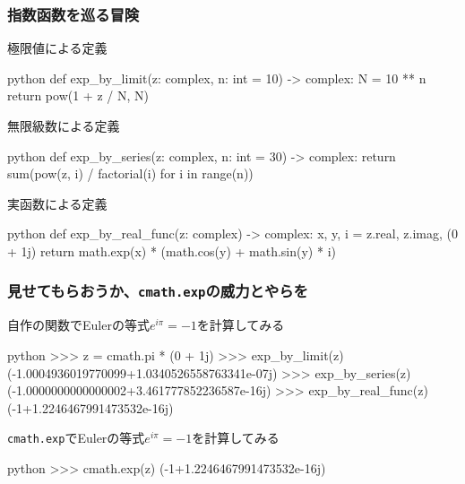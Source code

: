 \documentclass[dvipdfmx,11pt,notheorems]{beamer}
\theoremstyle{definition}
\begin{document}
\begin{frame}[fragile]\frametitle{指数函数を巡る冒険}

\begin{exampleblock}{極限値による定義}
\begin{pygments}{python}
def exp_by_limit(z: complex, n: int = 10) -> complex:
    N = 10 ** n
    return pow(1 + z / N, N)
\end{pygments}
\end{exampleblock}

\begin{exampleblock}{無限級数による定義}
\begin{pygments}{python}
def exp_by_series(z: complex, n: int = 30) -> complex:
    return sum(pow(z, i) / factorial(i) for i in range(n))
\end{pygments}
\end{exampleblock}

\begin{exampleblock}{実函数による定義}
\begin{pygments}{python}
def exp_by_real_func(z: complex) -> complex:
    x, y, i = z.real, z.imag, (0 + 1j)
    return math.exp(x) * (math.cos(y) + math.sin(y) * i)
\end{pygments}
\end{exampleblock}

\end{frame}

\begin{frame}[fragile]\frametitle{見せてもらおうか、\texttt{cmath.exp}の威力とやらを}
\begin{exampleblock}{自作の関数でEulerの等式$e^{i\pi} = -1$を計算してみる}
\begin{pygments}{python}
>>> z = cmath.pi * (0 + 1j)
>>> exp_by_limit(z)
(-1.0004936019770099+1.0340526558763341e-07j)
>>> exp_by_series(z)
(-1.0000000000000002+3.461777852236587e-16j)
>>> exp_by_real_func(z)
(-1+1.2246467991473532e-16j)
\end{pygments}
\end{exampleblock}

\begin{exampleblock}{\texttt{cmath.exp}でEulerの等式$e^{i\pi} = -1$を計算してみる}
\begin{pygments}{python}
>>> cmath.exp(z)
(-1+1.2246467991473532e-16j)
\end{pygments}
\end{exampleblock}

\end{frame}
\end{document}
